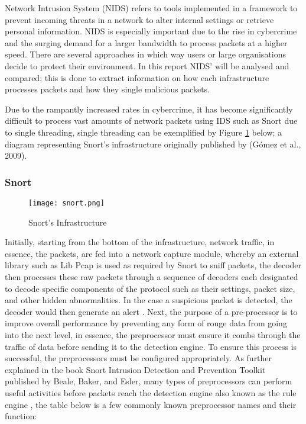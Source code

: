 \documentclass[12pt]{article}
\begin{document}
		Network Intrusion System (NIDS) refers to tools implemented in a framework to prevent incoming threats in a network to alter internal settings or retrieve personal information. NIDS is especially important due to the rise in cybercrime and the surging demand for a larger bandwidth to process packets at a higher speed. There are several approaches in which way users or large organisations decide to protect their environment.
		In this report NIDS' will be analysed and compared; this is done to extract information on how each infrastructure processes packets and how they single malicious packets.
		
		Due to the rampantly increased rates in cybercrime, it has become significantly difficult to process vast amounts of network packets using IDS such as Snort due to single threading, single threading can be exemplified by Figure \ref{fig:Snort} below; a diagram representing Snort's infrastructure originally published by (Gómez et al., 2009)\cite{gmez_2009_design}.
		\subsubsection{Snort}
		\begin{center}
			\begin{figure}[H]
				\centering
				\texttt{[image: snort.png]}
				\caption{Snort's Infrastructure \cite{fekolkin_2015_intrusion}}
				\label{fig:Snort}
			\end{figure}
		\end{center}
		
		Initially, starting from the bottom of the infrastructure, network traffic, in essence, the packets, are fed into a network capture module, whereby an external library such as Lib Pcap is used as required by Snort to sniff packets, the decoder then processes these raw packets through a sequence of decoders each designated to decode specific components of the protocol such as their settings, packet size, and other hidden abnormalities. In the case a suspicious packet is detected, the decoder would then generate an alert \cite{fekolkin_2015_intrusion}. Next, the purpose of a pre-processor is to improve overall performance by preventing any form of rouge data from going into the next level, in essence, the preprocessor must ensure it combs through the traffic of data before sending it to the detection engine.
		To ensure this process is successful, the preprocessors must be configured appropriately. As further explained in the book Snort Intrusion Detection and Prevention Toolkit published by Beale, Baker, and Esler, many types of preprocessors can perform useful activities before packets reach the detection engine also known as the rule engine \cite{beale_2007_snort}, the table below is a few commonly known preprocessor names and their function: 
		
\end{document}
